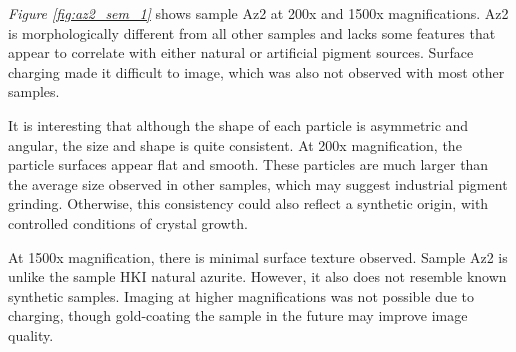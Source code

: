 \textit{Figure \ref{fig:az2_sem_1}} shows sample Az2 at 200x and 1500x magnifications. Az2 is morphologically different from all other samples and lacks some features that appear to correlate with either natural or artificial pigment sources. Surface charging made it difficult to image, which was also not observed with most other samples.

It is interesting that although the shape of each particle is asymmetric and angular, the size and shape is quite consistent. At 200x magnification, the particle surfaces appear flat and smooth. These particles are much larger than the average size observed in other samples, which may suggest industrial pigment grinding. Otherwise, this consistency could also reflect a synthetic origin, with controlled conditions of crystal growth.

At 1500x magnification, there is minimal surface texture observed. Sample Az2 is unlike the sample HKI natural azurite. However, it also does not resemble known synthetic samples. Imaging at higher magnifications was not possible due to charging, though gold-coating the sample in the future may improve image quality.

